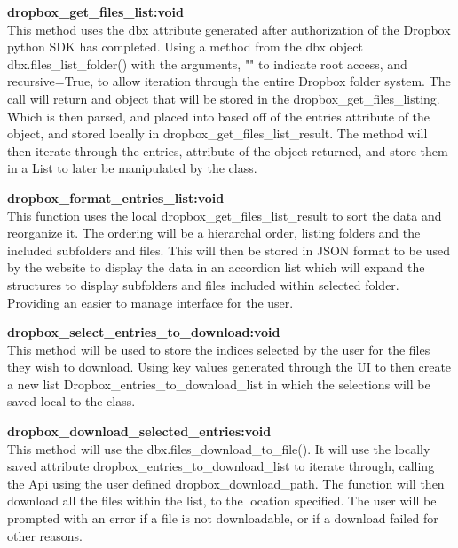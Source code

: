 \textbf{dropbox\_get\_files\_list:void} \\
    This method uses the dbx attribute generated after authorization of the Dropbox python SDK has completed. Using a method from the dbx object
    dbx.files\_list\_folder() with the arguments, "" to indicate root access, and recursive=True, to allow iteration through the entire Dropbox
    folder system. The call will return and object that will be stored in the dropbox\_get\_files\_listing. Which is then parsed, and placed into
    based off of the entries attribute of the object, and stored locally in dropbox\_get\_files\_list\_result. The method will then iterate through
    the entries, attribute of the object returned, and store them in a List to later be manipulated by the class.

\textbf{dropbox\_format\_entries\_list:void} \\
    This function uses the local dropbox\_get\_files\_list\_result to sort the data and reorganize it. The ordering will be a hierarchal order, listing 
    folders and the included subfolders and files. This will then be stored in JSON format to be used by the website to display the data in an
    accordion list which will expand the structures to display subfolders and files included within selected folder. Providing an easier to manage
    interface for the user.

\textbf{dropbox\_select\_entries\_to\_download:void} \\
    This method will be used to store the indices selected by the user for the files they wish to download. Using key values generated through 
    the UI to then create a new list Dropbox\_entries\_to\_download\_list in which the selections will be saved local to the class.

\textbf{dropbox\_download\_selected\_entries:void} \\
    This method will use the dbx.files\_download\_to\_file(). It will use the locally saved attribute dropbox\_entries\_to\_download\_list to
    iterate through, calling the Api using the user defined dropbox\_download\_path. The function will then download all the files within the 
    list, to the location specified. The user will be prompted with an error if a file is not downloadable, or if a download failed for other 
    reasons.

